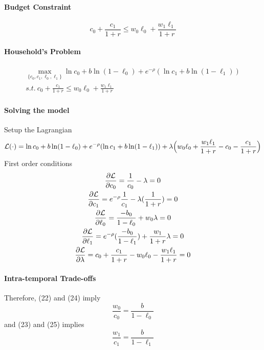 \documentclass[11pt]{article}
\begin{document}
				\paragraph{Budget Constraint}
					\begin{equation}
						c_0 + \frac{c_1}{1+r} \leq w_0 \ell_0 + \frac{w_1 \ell_1}{1+r}
					\end{equation}
				
				\paragraph{Household's Problem}
					\begin{gather*}
						\max_{\{c_0, c_1, \ell_0, \ell_1\}} \ln c_0 + b \ln (1-\ell_0) + e^{-\rho} (\ln c_1 + b \ln (1-\ell_1))\\
						s.t.\ c_0 + \frac{c_1}{1+r} \leq w_0 \ell_0 + \frac{w_1 \ell_1}{1+r}
					\end{gather*}
				
				\paragraph{Solving the model} Setup the Lagrangian
					\begin{equation}
						\mathcal{{L}}(\cdot) = \ln c_0 + b \ln (1-\ell_0) + e^{-\rho} (\ln c_1 + b \ln (1-\ell_1)) + \lambda \Big(w_0 \ell_0 + \frac{w_1 \ell_1}{1+r} - c_0 - \frac{c_1}{1+r} \Big)
					\end{equation}
					First order conditions
					\begin{gather}
							\frac{\partial{\mathcal{{L}}}}{\partial{c_0}} = \frac{1}{c_0} - \lambda = 0 \\
							\frac{\partial{\mathcal{{L}}}}{\partial{c_1}} = e^{-\rho} \frac{1}{c_1} - \lambda (\frac{1}{1+r}) = 0 \\
							\frac{\partial{\mathcal{{L}}}}{\partial{\ell_0}} = \frac{-b_0}{1-\ell_0} + w_0 \lambda = 0 \\
							\frac{\partial{\mathcal{{L}}}}{\partial{\ell_1}} = e^{-\rho}(\frac{-b_0}{1-\ell_1}) + \frac{w_1}{1+r}\lambda = 0 \\
							\frac{\partial{\mathcal{{L}}}}{\partial{\lambda}} = c_0 + \frac{c_1}{1+r} - w_0 \ell_0 - \frac{w_1 \ell_1}{1+r} = 0
					\end{gather}
					\paragraph{Intra-temporal Trade-offs}
						Therefore, (22) and (24) imply
						\begin{equation}
							\frac{w_0}{c_0} = \frac{b}{1-\ell_0}
						\end{equation}
						and (23) and (25) implies
						\begin{equation}
							\frac{w_1}{c_1} = \frac{b}{1-\ell_1}
						\end{equation}
\end{document}
